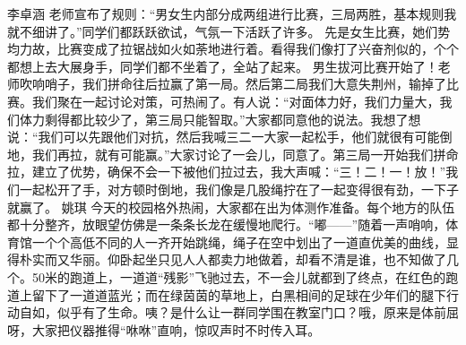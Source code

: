 {}\markdownRendererInterblockSeparator
{}李卓涵\markdownRendererInterblockSeparator
{}老师宣布了规则：“男女生内部分成两组进行比赛，三局两胜，基本规则我就不细讲了。”同学们都跃跃欲试，气氛一下活跃了许多。\markdownRendererInterblockSeparator
{}先是女生比赛，她们势均力故，比赛变成了拉锯战如火如荼地进行着。看得我们像打了兴奋剂似的，个个都想上去大展身手，同学们都不坐着了，全站了起来。\markdownRendererInterblockSeparator
{}男生拔河比赛开始了！老师吹响哨子，我们拼命往后拉赢了第一局。然后第二局我们大意失荆州，输掉了比赛。我们聚在一起讨论对策，可热闹了。有人说：“对面体力好，我们力量大，我们体力剩得都比较少了，第三局只能智取。”大家都同意他的说法。我想了想说：“我们可以先跟他们对抗，然后我喊三二一大家一起松手，他们就很有可能倒地，我们再拉，就有可能赢。”大家讨论了一会儿，同意了。第三局一开始我们拼命拉，建立了优势，确保不会一下被他们拉过去，我大声喊：“三！二！一！放！”我们一起松开了手，对方顿时倒地，我们像是几股绳拧在了一起变得很有劲，一下子就赢了。\markdownRendererInterblockSeparator
{}\markdownRendererInterblockSeparator
{}姚琪\markdownRendererInterblockSeparator
{}今天的校园格外热闹，大家都在出为体测作准备。每个地方的队伍都十分整齐，放眼望仿佛是一条条长龙在缓慢地爬行。“嘟——”随着一声哨响，体育馆一个个高低不同的人一齐开始跳绳，绳子在空中划出了一道直优美的曲线，显得朴实而又华丽。仰卧起坐只见人人都卖力地做着，却看不清是谁，也不知做了几个。50米的跑道上，一道道“残影”飞驰过去，不一会儿就都到了终点，在红色的跑道上留下了一道道蓝光；而在绿茵茵的草地上，白黑相间的足球在少年们的腿下行动自如，似乎有了生命。咦？是什么让一群同学围在教室门口？哦，原来是体前屈呀，大家把仪器推得“咻咻”直响，惊叹声时不时传入耳。\relax